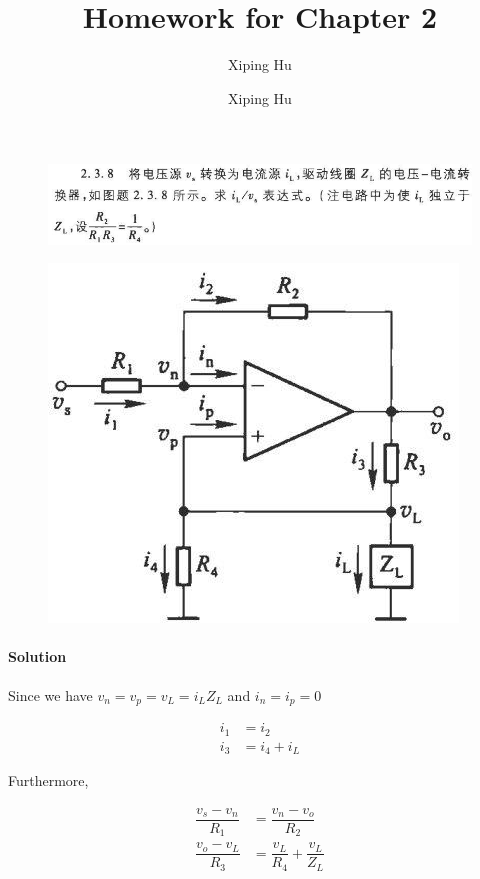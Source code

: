\documentclass{article}
\author{Xiping Hu}
\author{Xiping Hu}
\affil{http://thehxp.tech/}
\title{Homework for Chapter 2}
\begin{document}
\maketitle

\begin{figure}[H]
  \centering
  \includegraphics[width=0.9\linewidth]{figures/Problem1-0}
  \label{fig:}
\end{figure}

\begin{figure}[H]
  \centering
  \includegraphics[width=0.4\linewidth]{figures/Problem1-1}
  \label{fig:}
\end{figure}

\paragraph{Solution}

Since we have $v_n = v_p = v_L = i_L Z_L$ and $i_n = i_p = 0$

\begin{equation*}
  \begin{aligned}
    i_1 &= i_2 \\
    i_3 &= i_4 + i_L
  \end{aligned}
\end{equation*}

Furthermore,

\begin{equation*}
  \begin{aligned}
  \dfrac{v_s - v_n}{R_1} &= \dfrac{v_n - v_o}{R_2} \\
  \dfrac{v_o - v_L}{R_3} &= \dfrac{v_L}{R_4} + \dfrac{v_L}{Z_L}   
  \end{aligned}
\end{equation*}
\end{document}
